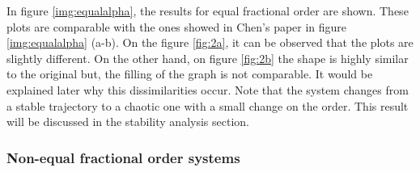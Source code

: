In figure \ref{img:equalalpha}, the results for equal fractional order are shown. These plots are comparable with the ones showed in Chen's paper \cite{main} in figure \ref{img:equalalpha} (a-b). On the figure \ref{fig:2a}, it can be observed that the plots are slightly different. On the other hand, on figure \ref{fig:2b} the shape is highly similar to the original but, the filling of the graph is not comparable. It would be explained later why this dissimilarities occur. Note that the system changes from a stable trajectory to a chaotic one with a small change on the order. This result will be discussed in the stability analysis section.

\subsubsection{Non-equal fractional order systems}
